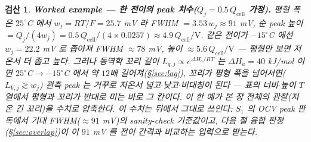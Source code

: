 \documentclass[11pt,a4paper]{article}
\newtheorem*{verifybox}{검산}
\newcommand{\cell}{\mathrm{cell}}
\begin{document}
\begin{verifybox}
\textbf{Worked example — 한 전이의 peak 치수($Q_j=0.5\,Q_\cell$ 가정).} 평형 폭은 $25^\circ$C 에서
$w_j=RT/F=25.7$ mV 라 FWHM $=3.53\,w_j\approx91$ mV, 순 peak 높이 $=Q_j/(4w_j)=0.5\,Q_\cell/(4\times0.0257)
\approx4.9\,Q_\cell/\mathrm V$. 같은 전이가 $-15^\circ$C 에선 $w_j=22.2$ mV 로 좁아져 FWHM $\approx78$ mV, 높이
$\approx5.6\,Q_\cell/\mathrm V$ — \emph{평형만 보면 저온서 더 좁고 높다}. 그러나 동역학 꼬리 길이 $L_{q,j}\propto
e^{\Delta H_a/RT}$ 는 $\Delta H_a=40$ kJ/mol 이면 $25^\circ$C$\to-15^\circ$C 에서 약 $12$배 길어져(\S\ref{sec:lag}),
꼬리가 평형 폭을 넘어서면($L_{V,j}\gtrsim w_j$) 관측 peak 는 거꾸로 \emph{저온서 넓고$\cdot$낮고$\cdot$비대칭}이
된다 — 표의 너비$\cdot$높이 $T$ 열에서 평형과 꼬리가 반대로 미는 바로 그 칸이다. 이 한 예가 본 장 전체의
관찰(저온 긴 꼬리)을 수치로 압축한다. \emph{이 수치는 뒤에서 그대로 쓰인다}: $S_1$ 의 OCV peak 판독에서 기대
FWHM($\approx91$ mV)의 sanity-check 기준값이고, 다음 절 융합 판정(\S\ref{sec:overlap})이 이 $91$ mV 를 전이 간격과
비교하는 입력으로 받는다.
\end{verifybox}
\end{document}
